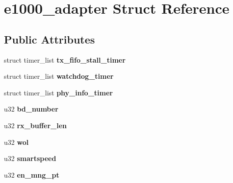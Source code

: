 \hypertarget{structe1000__adapter}{
\section{e1000\_\-adapter Struct Reference}
\label{structe1000__adapter}
}
\subsection*{Public Attributes}
\begin{DoxyCompactItemize}
\item 
\hypertarget{structe1000__adapter_a73eb4fdfe6cc0d8b0cf06341ef404ed8}{
struct timer\_\-list {\bfseries tx\_\-fifo\_\-stall\_\-timer}}
\label{structe1000__adapter_a73eb4fdfe6cc0d8b0cf06341ef404ed8}

\item 
\hypertarget{structe1000__adapter_ad0a78887d6d6b1a41c80f55b6cdc138b}{
struct timer\_\-list {\bfseries watchdog\_\-timer}}
\label{structe1000__adapter_ad0a78887d6d6b1a41c80f55b6cdc138b}

\item 
\hypertarget{structe1000__adapter_a51a22a757521e79d522aee7ddc443df7}{
struct timer\_\-list {\bfseries phy\_\-info\_\-timer}}
\label{structe1000__adapter_a51a22a757521e79d522aee7ddc443df7}

\item 
\hypertarget{structe1000__adapter_a4f457f28049ec084346bee90b44265e9}{
u32 {\bfseries bd\_\-number}}
\label{structe1000__adapter_a4f457f28049ec084346bee90b44265e9}

\item 
\hypertarget{structe1000__adapter_a491c5e6f69fc1889148b39ed5ade3298}{
u32 {\bfseries rx\_\-buffer\_\-len}}
\label{structe1000__adapter_a491c5e6f69fc1889148b39ed5ade3298}

\item 
\hypertarget{structe1000__adapter_a4e7fb24f2734422660e48200d0b5503b}{
u32 {\bfseries wol}}
\label{structe1000__adapter_a4e7fb24f2734422660e48200d0b5503b}

\item 
\hypertarget{structe1000__adapter_a5186f33c6b5302c5f3b5afda0aa92815}{
u32 {\bfseries smartspeed}}
\label{structe1000__adapter_a5186f33c6b5302c5f3b5afda0aa92815}

\item 
\hypertarget{structe1000__adapter_ae02aef9ee07e199c8a8fef0150835cac}{
u32 {\bfseries en\_\-mng\_\-pt}}
\label{structe1000__adapter_ae02aef9ee07e199c8a8fef0150835cac}


\end{DoxyCompactItemize}
